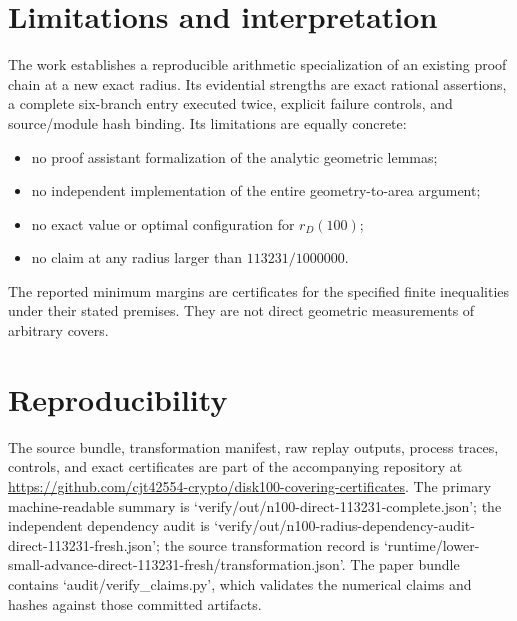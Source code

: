 \documentclass[11pt]{article}
\newcommand{\rd}{r_D}
\begin{document}
\section{Limitations and interpretation}
The work establishes a reproducible arithmetic specialization of an existing proof chain at a new exact radius. Its evidential strengths are exact rational assertions, a complete six-branch entry executed twice, explicit failure controls, and source/module hash binding. Its limitations are equally concrete:
\begin{itemize}
 \item no proof assistant formalization of the analytic geometric lemmas;
 \item no independent implementation of the entire geometry-to-area argument;
 \item no exact value or optimal configuration for $\rd(100)$;
 \item no claim at any radius larger than $113231/1000000$.
\end{itemize}
The reported minimum margins are certificates for the specified finite inequalities under their stated premises. They are not direct geometric measurements of arbitrary covers.

\section{Reproducibility}
The source bundle, transformation manifest, raw replay outputs, process traces, controls, and exact certificates are part of the accompanying repository at \url{https://github.com/cjt42554-crypto/disk100-covering-certificates}. The primary machine-readable summary is `verify/out/n100-direct-113231-complete.json'; the independent dependency audit is `verify/out/n100-radius-dependency-audit-direct-113231-fresh.json'; the source transformation record is `runtime/lower-small-advance-direct-113231-fresh/transformation.json'. The paper bundle contains `audit/verify\_claims.py', which validates the numerical claims and hashes against those committed artifacts.



\appendix
\end{document}
